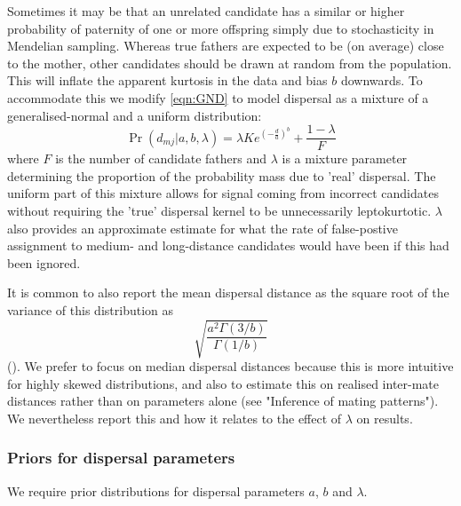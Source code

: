 \documentclass[10pt, a4paper, twocolumn]{article} %
\begin{document}
Sometimes it may be that an unrelated candidate has a similar or higher probability of paternity of one or more offspring simply due to stochasticity in Mendelian sampling.
Whereas true fathers are expected to be (on average) close to the mother, other candidates should be drawn at random from the population. This will inflate the apparent kurtosis in the data and bias $b$ downwards.
To accommodate this we modify \ref{eqn:GND} to model dispersal as a mixture of a generalised-normal and a uniform distribution:
\begin{equation}\label{eqn:mixture_model}
\Pr(d_{mj} | a,b,\lambda) = \lambda K e^{  (-\frac{d}{a} )^b } + \frac{1-\lambda}{F}
\end{equation}
where $F$ is the number of candidate fathers and $\lambda$ is a mixture parameter determining the proportion of the probability mass due to ’real’ dispersal.
The uniform part of this mixture allows for signal coming from incorrect candidates without requiring the 'true' dispersal kernel to be unnecessarily leptokurtotic.
$\lambda$ also provides an approximate estimate for what the rate of false-postive assignment to medium- and long-distance candidates would have been if this had been ignored.

It is common to also report the mean dispersal distance as the square root of the variance of this distribution as
\begin{equation}
\label{eqn:sd_GND}    
\sqrt{ \frac{ a^2 \Gamma(3/b) }{ \Gamma(1/b) } }
\end{equation}
(\cite{Nadarajah2005}).
We prefer to focus on median dispersal distances because this is more intuitive for highly skewed distributions, and also to estimate this on realised inter-mate distances rather than on parameters alone (see "Inference of mating patterns"). We nevertheless report this and how it relates to the effect of $\lambda$ on results.

\subsubsection{Priors for dispersal parameters}

We require prior distributions for dispersal parameters $a$, $b$ and $\lambda$.
\end{document}
